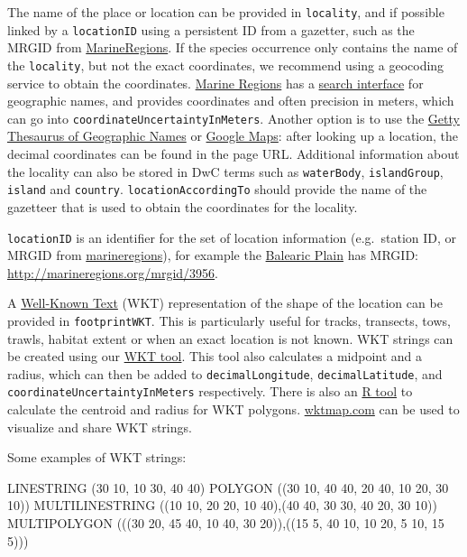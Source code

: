 \documentclass[
  letterpaper,
  DIV=11,
  numbers=noendperiod,
  oneside]{scrreprt}
\newenvironment{Shaded}{\begin{snugshade}}{\end{snugshade}}
\newcommand{\NormalTok}[1]{\textcolor[rgb]{0.00,0.23,0.31}{#1}}
\begin{document}
The name of the place or location can be provided in \texttt{locality},
and if possible linked by a \texttt{locationID} using a persistent ID
from a gazetter, such as the MRGID from
\href{http://www.marineregions.org/gazetteer.php?p=search}{MarineRegions}.
If the species occurrence only contains the name of the
\texttt{locality}, but not the exact coordinates, we recommend using a
geocoding service to obtain the coordinates.
\href{http://www.marineregions.org/}{Marine Regions} has a
\href{http://www.marineregions.org/gazetteer.php?p=search}{search
interface} for geographic names, and provides coordinates and often
precision in meters, which can go into
\texttt{coordinateUncertaintyInMeters}. Another option is to use the
\href{http://www.getty.edu/research/tools/vocabularies/tgn/}{Getty
Thesaurus of Geographic Names} or \href{http://maps.google.com}{Google
Maps}: after looking up a location, the decimal coordinates can be found
in the page URL. Additional information about the locality can also be
stored in DwC terms such as \texttt{waterBody}, \texttt{islandGroup},
\texttt{island} and \texttt{country}. \texttt{locationAccordingTo}
should provide the name of the gazetteer that is used to obtain the
coordinates for the locality.

\texttt{locationID} is an identifier for the set of location information
(e.g.~station ID, or MRGID from
\href{http://www.marineregion.org}{marineregions}), for example the
\href{http://www.marineregions.org/gazetteer.php?p=details\&id=3956}{Balearic
Plain} has MRGID: \url{http://marineregions.org/mrgid/3956}.

A \href{https://en.wikipedia.org/wiki/Well-known_text}{Well-Known Text}
(WKT) representation of the shape of the location can be provided in
\texttt{footprintWKT}. This is particularly useful for tracks,
transects, tows, trawls, habitat extent or when an exact location is not
known. WKT strings can be created using our
\href{https://obis.org/maptool}{WKT tool}. This tool also calculates a
midpoint and a radius, which can then be added to
\texttt{decimalLongitude}, \texttt{decimalLatitude}, and
\texttt{coordinateUncertaintyInMeters} respectively. There is also an
\href{https://github.com/iobis/obistools\#calculate-centroid-and-radius-for-wkt-geometries}{R
tool} to calculate the centroid and radius for WKT polygons.
\href{https://wktmap.com}{wktmap.com} can be used to visualize and share
WKT strings.

Some examples of WKT strings:

\begin{Shaded}
\begin{Highlighting}[]
\NormalTok{LINESTRING (30 10, 10 30, 40 40)}
\NormalTok{POLYGON ((30 10, 40 40, 20 40, 10 20, 30 10))}
\NormalTok{MULTILINESTRING ((10 10, 20 20, 10 40),(40 40, 30 30, 40 20, 30 10))}
\NormalTok{MULTIPOLYGON (((30 20, 45 40, 10 40, 30 20)),((15 5, 40 10, 10 20, 5 10, 15 5)))}
\end{Highlighting}
\end{Shaded}
\end{document}
